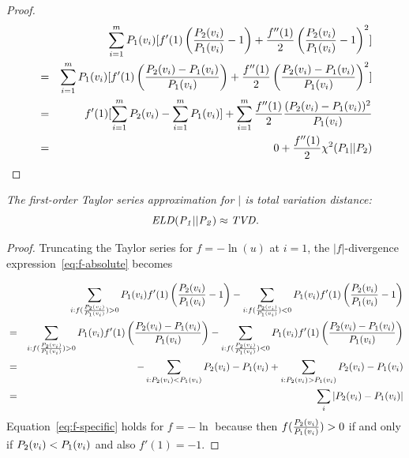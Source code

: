 {\begin{proof}
\begin{eqnarray*}
& & \sum_{i=1}^{m} P_{1}(v_{i}) [f'(1) \left(\frac{P_{2}(v_{i})}{P_{1}(v_{i})}-1\right) + \frac{f''(1)}{2} \left(\frac{P_{2}(v_{i})}{P_{1}(v_{i})}-1\right)^{2}]  \\
& = &\sum_{i=1}^{m} P_{1}(v_{i}) [f'(1) \left(\frac{P_{2}(v_{i})-P_{1}(v_{i})}{P_{1}(v_{i})}\right) + \frac{f''(1)}{2} \left(\frac{P_{2}(v_{i})-P_{1}(v_{i})}{P_{1}(v_{i})}\right)^{2}] \\
 & = & f'(1) [\sum_{i=1}^{m} P_{2}(v_{i}) - \sum_{i=1}^{m} P_{1}(v_{i})] + \sum_{i=1}^{m} \frac{f''(1)}{2} 
 \frac{(P_{2}(v_{i})-P_{1}(v_{i}))^{2}}
 {P_{1}(v_{i})} \\
& = &   0 + \frac{f''(1)}{2} \chi^{2}(P_{1}||P_{2})
\end{eqnarray*}

\end{proof}

{\em The first-order Taylor series approximation for $\mid$ is total variation distance:
$$\it{ELD}(P_{1}||P_{2}) \approx  TVD. $$}

\begin{proof}
Truncating the Taylor series for $f=-\ln(u)$ at $i=1$, the $|f|$-divergence expression~\ref{eq:f-absolute} becomes 

\begin{eqnarray}
& & \sum_{i:f(\frac{P_{2}(v_{i})}{P_{1}(v_{i})})>0} P_{1}(v_{i}) f'(1) \left(\frac{P_{2}(v_{i})}{P_{1}(v_{i})}-1\right) -  \sum_{i:f(\frac{P_{2}(v_{i})}{P_{1}(v_{i})})<0} P_{1}(v_{i}) f'(1) \left(\frac{P_{2}(v_{i})}{P_{1}(v_{i})}-1\right) \notag \\
& = &\sum_{i:f(\frac{P_{2}(v_{i})}{P_{1}(v_{i})})>0} P_{1}(v_{i}) f'(1) \left(\frac{P_{2}(v_{i})-P_{1}(v_{i})}{P_{1}(v_{i})}\right) - \sum_{i:f(\frac{P_{2}(v_{i})}{P_{1}(v_{i})})<0} P_{1}(v_{i}) f'(1) \left(\frac{P_{2}(v_{i})-P_{1}(v_{i})}{P_{1}(v_{i})}\right) \notag \\
 & = & 
- \sum_{i:P_{2}(v_{i})<P_{1}(v_{i})}
P_{2}(v_{i})-P_{1}(v_{i}) + \sum_{i:P_{2}(v_{i})>P_{1}(v_{i})}
 P_{2}(v_{i})-P_{1}(v_{i}) \label{eq:f-specific}
 \\
& = &   \sum_{i} |P_{2}(v_{i})-P_{1}(v_{i}) | \notag
\end{eqnarray}
Equation~\eqref{eq:f-specific} holds for $f = -\ln$ because then $f(\frac{P_{2}(v_{i})}{P_{1}(v_{i})})>0$ if and only if $P_{2}(v_{i}) < P_{1}(v_{i})$ and also $f'(1) = -1$.
\end{proof}




}
